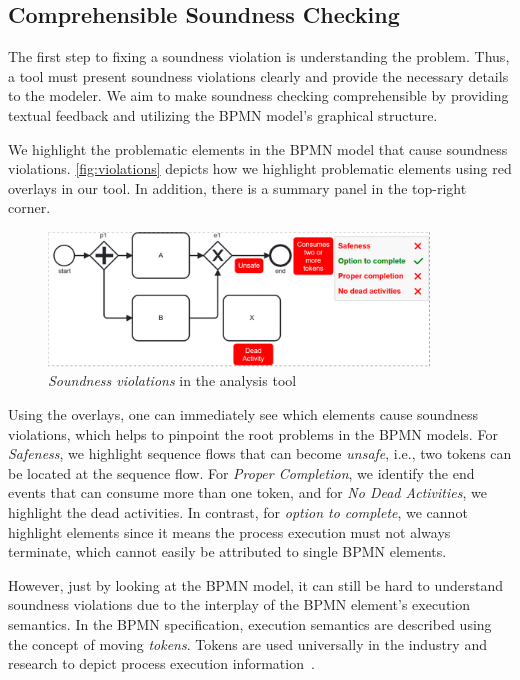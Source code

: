 \documentclass[runningheads]{llncs}
\begin{document}
\subsection{Comprehensible Soundness Checking}

The first step to fixing a soundness violation is understanding the problem.
Thus, a tool must present soundness violations clearly and provide the necessary details to the modeler.
We aim to make soundness checking comprehensible by providing textual feedback and utilizing the BPMN model's graphical structure.

We highlight the problematic elements in the BPMN model that cause soundness violations.
\autoref{fig:violations} depicts how we highlight problematic elements using red overlays in our tool.
In addition, there is a summary panel in the top-right corner.

\begin{figure}[ht]
	\centering
	\includegraphics[width=0.9\textwidth]{images/violations}
	\caption{\textit{Soundness violations} in the analysis tool}
	\label{fig:violations}
\end{figure}

Using the overlays, one can immediately see which elements cause soundness violations, which helps to pinpoint the root problems in the BPMN models.
For \textit{Safeness}, we highlight sequence flows that can become \textit{unsafe}, i.e., two tokens can be located at the sequence flow.
For \textit{Proper Completion}, we identify the end events that can consume more than one token, and for \textit{No Dead Activities}, we highlight the dead activities.
In contrast, for \textit{option to complete}, we cannot highlight elements since it means the process execution must not always terminate, which cannot easily be attributed to single BPMN elements.

However, just by looking at the BPMN model, it can still be hard to understand soundness violations due to the interplay of the BPMN element's execution semantics.
In the BPMN specification, execution semantics are described using the concept of moving \textit{tokens}.
Tokens are used universally in the industry and research to depict process execution information~\cite{camundaservicesgmbhBpmnjsTokenSimulation2024,corradiniFormalApproachAnalysis2021,corradiniFormalisingAnimatingMultiple2022,houhouFirstOrderLogicVerification2022,krauterFormalizationAnalysisBPMN2023,krauterHigherorderTransformationApproach2023}.
\end{document}
